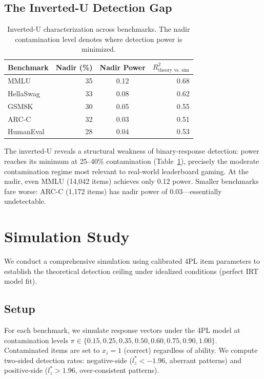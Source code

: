 \documentclass[11pt]{article}
\begin{document}
\subsection{The Inverted-U Detection Gap}

\begin{table}[t]
\centering
\caption{Inverted-U characterization across benchmarks. The nadir contamination level denotes where detection power is minimized.}
\label{tab:inverted-u}
\begin{tabular}{lrcr}
\toprule
Benchmark & Nadir (\%) & Nadir Power & $R^2_\text{theory vs.\ sim}$ \\
\midrule
MMLU      & 35 & 0.12 & 0.68 \\
HellaSwag & 33 & 0.08 & 0.62 \\
GSM8K     & 30 & 0.05 & 0.55 \\
ARC-C     & 32 & 0.03 & 0.51 \\
HumanEval & 28 & 0.04 & 0.53 \\
\bottomrule
\end{tabular}
\end{table}

The inverted-U reveals a structural weakness of binary-response detection: power reaches its minimum at 25--40\% contamination (Table~\ref{tab:inverted-u}), precisely the moderate contamination regime most relevant to real-world leaderboard gaming.
At the nadir, even MMLU (14,042 items) achieves only 0.12 power.
Smaller benchmarks fare worse: ARC-C (1,172 items) has nadir power of 0.03---essentially undetectable.

\section{Simulation Study}
\label{sec:simulation}

We conduct a comprehensive simulation using calibrated 4PL item parameters to establish the theoretical detection ceiling under idealized conditions (perfect IRT model fit).

\subsection{Setup}

For each benchmark, we simulate response vectors under the 4PL model at contamination levels $\pi \in \{0.15, 0.25, 0.35, 0.50, 0.60, 0.75, 0.90, 1.00\}$.
Contaminated items are set to $x_i = 1$ (correct) regardless of ability.
We compute two-sided detection rates: negative-side ($l_z^* < -1.96$, aberrant patterns) and positive-side ($l_z^* > 1.96$, over-consistent patterns).
\end{document}
